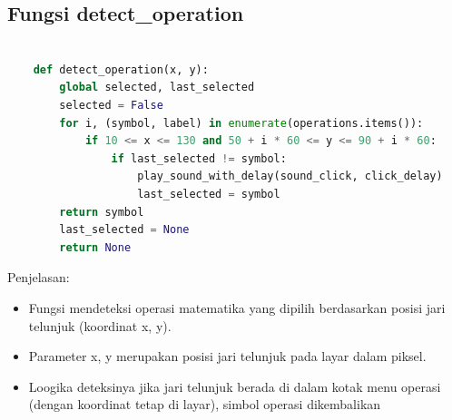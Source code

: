 \documentclass[11pt,a4paper]{article}
\begin{document}
    \subsection{Fungsi detect\_operation}
    \begin{lstlisting}[language=Python, caption=Fungsi Mendeteksi Operasi Aktif]
    
    def detect_operation(x, y):
        global selected, last_selected
        selected = False
        for i, (symbol, label) in enumerate(operations.items()):
            if 10 <= x <= 130 and 50 + i * 60 <= y <= 90 + i * 60:
                if last_selected != symbol:
                    play_sound_with_delay(sound_click, click_delay)
                    last_selected = symbol
        return symbol
        last_selected = None
        return None
    \end{lstlisting}
    Penjelasan:
    \begin{itemize}
        \item Fungsi mendeteksi operasi matematika yang dipilih berdasarkan posisi jari telunjuk (koordinat x, y).
        \item Parameter x, y merupakan posisi jari telunjuk pada layar dalam piksel.
        \item Loogika deteksinya jika jari telunjuk berada di dalam kotak menu operasi (dengan koordinat tetap di layar), simbol operasi dikembalikan
    \end{itemize}
\end{document}
